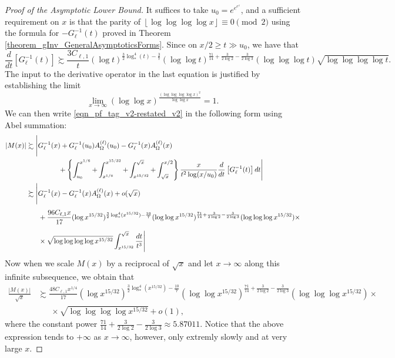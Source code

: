 \documentclass[11pt,reqno,a4letter]{article}
\numberwithin{figure}{section}
\numberwithin{table}{section}
\newcommand{\floor}[1]{\left\lfloor #1 \right\rfloor}
\theoremstyle{plain}
\numberwithin{theorem}{section}
\theoremstyle{definition}
\begin{document}
\begin{proof}[Proof of the Asymptotic Lower Bound] 
It suffices to take $u_0 = e^{e^{e^{e}}}$, 
and a sufficient requirement on $x$ is that the parity of 
$\floor{\log\log\log\log x} \equiv 0 \pmod{2}$ using the formula for 
$-G_{\ell}^{-1}(t)$ proved in Theorem \ref{theorem_gInv_GeneralAsymptoticsForms}. 
Since on $x/2 \geq t \gg u_0$, we have that 
\[
\frac{d}{dt}\left[G_{\ell}^{-1}(t)\right] \succsim 
     \frac{3 C_{\ell,1}}{t} (\log t)^{\frac{3}{2} \log_{\ast}^4(t) - \frac{3}{7}} 
     (\log\log t)^{\frac{71}{14} + \frac{3}{2 \log 2} - \frac{3}{2 \log 3}} 
     (\log\log\log t) \sqrt{\log\log\log\log t}. 
\]
The input to the derivative operator in the last equation is justified by establishing the limit 
\[
\lim_{x \rightarrow \infty} (\log\log x)^{\frac{(\log\log\log\log x)^2}{\log\log x}} = 1. 
\]
We can then write \eqref{eqn_pf_tag_v2-restated_v2} in the following form using Abel summation: 
\begin{align} 
\label{eqn_pf_tag_v2-restated_v3} 
|M(x)| & \succsim \Biggl\lvert G_{\ell}^{-1}(x) + G_{\ell}^{-1}(u_0) A_{\Omega}^{(\ell)}(u_0) - 
      G_{\ell}^{-1}(x) A_{\Omega}^{(\ell)}(x) \\ 
\notag 
      & \phantom{\succsim G_{ell}^{-1}(x)\ } + 
      \left\{\int_{u_0}^{x^{1/6}} + \int_{x^{1/6}}^{x^{15/32}} + \int_{x^{15/32}}^{\sqrt{x}} + 
      \int_{\sqrt{x}}^{x/2}\right\} 
      \frac{x}{t^2 \log(x/u_0)} \frac{d}{dt}\left[G_{\ell}^{-1}(t)\right] dt 
      \Biggr\rvert \\ 
\notag 
      & \succsim \Biggl\lvert G_{\ell}^{-1}(x) - 
      G_{\ell}^{-1}(x) A_{\Omega}^{(\ell)}(x) + o(\sqrt{x}) \\ 
\notag 
      & \phantom{\succsim \Biggl\lvert\ } + 
      \frac{96 C_{\ell,1} x}{17} (\log x^{15/32})^{\frac{3}{2} 
      \log_{\ast}^4(x^{15/32}) - \frac{10}{7}} 
      (\log\log x^{15/32})^{\frac{71}{14} + \frac{3}{2 \log 2} - \frac{3}{2 \log 3}} 
      (\log\log\log x^{15/32}) \times \\ 
\notag 
      & \phantom{\succsim \Biggl\lvert\ } \times 
      \sqrt{\log\log\log\log x^{15/32}} 
      \int_{x^{15/32}}^{\sqrt{x}} \frac{dt}{t^3}  
      \Biggr\rvert 
\end{align} 
Now when we scale $M(x)$ by a reciprocal of $\sqrt{x}$ and let 
$x \rightarrow \infty$ along this infinite subsequence, we obtain that 
\begin{align*} 
\frac{|M(x)|}{\sqrt{x}} & \succsim 
     \frac{48 C_{\ell,1} x^{1/4}}{17} (\log x^{15/32})^{\frac{3}{2} 
      \log_{\ast}^4(x^{15/32}) - \frac{10}{7}} 
      (\log\log x^{15/32})^{\frac{71}{14} + \frac{3}{2 \log 2} - \frac{3}{2 \log 3}} 
      (\log\log\log x^{15/32}) \times \\ 
      & \phantom{\succsim\ } \times 
      \sqrt{\log\log\log\log x^{15/32}}  + o(1), 
\end{align*} 
where the constant power 
$\frac{71}{14} + \frac{3}{2\log 2} - \frac{3}{2\log 3} \approx 5.87011$. 
Notice that the above expression tends to $+\infty$ as $x \rightarrow \infty$, however, only 
extremly slowly and at very large $x$. 
\end{proof} 
\end{document}
